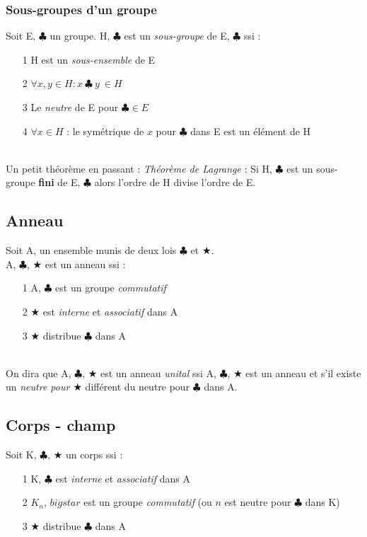 \documentclass[12pt, a4paper]{article}
\begin{document}
\subsubsection{Sous-groupes d'un groupe}
Soit E, $\clubsuit$ un groupe. H, $\clubsuit$ est un \textit{sous-groupe} de  E, $\clubsuit$ ssi :
\begin{itemize}
\item[1] H est un \textit{sous-ensemble} de E
\item[2] $\forall x, y \in H : x\ \clubsuit\ y\ \in H$
\item[3] Le \textit{neutre} de E pour $\clubsuit \in E$
\item[4] $\forall x \in H$ : le symétrique de $x$ pour $\clubsuit$ dans E est un élément de H
\end{itemize}
\ \\
Un petit théorème en passant : \textit{Théorème de Lagrange} : Si H, $\clubsuit$ est un sous-groupe \textbf{fini} de E, $\clubsuit$ alors l'ordre de H divise l'ordre de E.

\subsection{Anneau}
Soit A, un ensemble munis de deux lois $\clubsuit$ et $\bigstar$.\\
A, $\clubsuit$, $\bigstar$ est un anneau ssi :
\begin{itemize}
\item[1] A, $\clubsuit$ est un groupe \textit{commutatif}
\item[2] $\bigstar$ est \textit{interne} et \textit{associatif} dans A
\item[3] $\bigstar$ distribue $\clubsuit$ dans A
\end{itemize}
\ \\
On dira que A, $\clubsuit$, $\bigstar$ est un anneau \textit{unital} ssi A, $\clubsuit$, $\bigstar$ est un anneau et s'il existe un \textit{neutre pour $\bigstar$} différent du neutre pour $\clubsuit$ dans A.

\subsection{Corps - champ}
Soit K, $\clubsuit$, $\bigstar$ un corps ssi : 
\begin{itemize}
\item[1] K, $\clubsuit$ est \textit{interne} et \textit{associatif} dans A
\item[2] $K_{n}$, $bigstar$ est un groupe \textit{commutatif} (ou $n$ est neutre pour $\clubsuit$ dans K)

\item[3] $\bigstar$ distribue $\clubsuit$ dans A
\end{itemize}
\ \\
\end{document}

